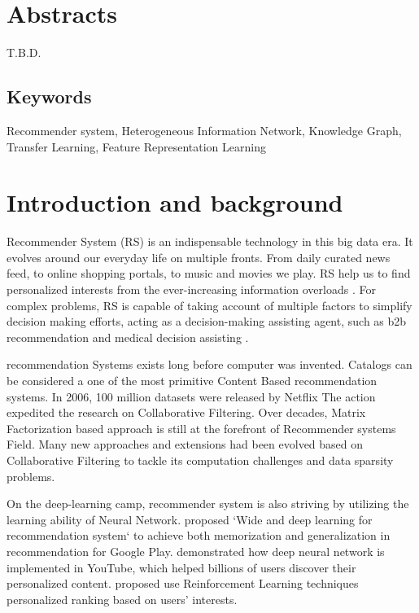 
\section*{Abstracts}
T.B.D.

\subsection*{Keywords} 
Recommender system, Heterogeneous Information Network, Knowledge Graph, Transfer Learning, Feature Representation Learning

\section{Introduction and background}
Recommender System (RS) is an indispensable technology in this big data era. It evolves around our everyday life on multiple fronts. 
From daily curated news feed, to online shopping portals, to music and movies we play. RS help us to find personalized interests from the ever-increasing information overloads \citep{Lu2015}. 
For complex problems, RS is capable of taking account of multiple factors to simplify decision making efforts, acting as a decision-making assisting agent, such as b2b recommendation \citep{shambour2012trust} and medical decision assisting \citep{zhang2017idoctor}.

recommendation Systems exists long before computer was invented. Catalogs can be considered a one of the most primitive Content Based recommendation systems. In 2006, 100 million datasets were released by Netflix \citep{Bennett2007} The action expedited the research on Collaborative Filtering. Over decades, Matrix Factorization based approach is still at the forefront of Recommender systems Field. Many new approaches and extensions had been evolved based on Collaborative Filtering to tackle its computation challenges and data sparsity problems. 

On the deep-learning camp, recommender system is also striving by utilizing the learning ability of Neural Network. \citet{Cheng2016} proposed `Wide and deep learning for recommendation system` to achieve both memorization and generalization in recommendation for Google Play. \citet{Covington2016} demonstrated how deep neural network is implemented in YouTube, which helped billions of users discover their personalized content. \citet{Karatzoglou2013} proposed use Reinforcement Learning techniques personalized ranking based on users’ interests.  

